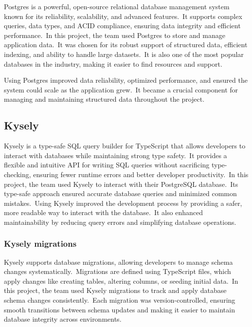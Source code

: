 Postgres is a powerful, open-source relational database management system known for its reliability, scalability, and advanced features.\ It supports complex queries, data types, and ACID compliance, ensuring data integrity and efficient performance.\ In this project, the team used Postgres to store and manage application data.\ It was chosen for its robust support of structured data, efficient indexing, and ability to handle large datasets.\ It is also one of the most popular databases in the industry, making it easier to find resources and support.\cite[Postgres]{postgres}

Using Postgres improved data reliability, optimized performance, and ensured the system could scale as the application grew.\ It became a crucial component for managing and maintaining structured data throughout the project.

\subsection{Kysely}\label{subsec:kysely}

Kysely is a type-safe SQL query builder for TypeScript that allows developers to interact with databases while maintaining strong type safety.\ It provides a flexible and intuitive API for writing SQL queries without sacrificing type-checking, ensuring fewer runtime errors and better developer productivity.\ In this project, the team used Kysely to interact with their PostgreSQL database.\ Its type-safe approach ensured accurate database queries and minimized common mistakes.\ Using Kysely improved the development process by providing a safer, more readable way to interact with the database.\ It also enhanced maintainability by reducing query errors and simplifying database operations.\cite[Kysely]{kysely}

\subsubsection{Kysely migrations}\label{subsubsec:kysely-migrations}

Kysely supports database migrations, allowing developers to manage schema changes systematically.\ Migrations are defined using TypeScript files, which apply changes like creating tables, altering columns, or seeding initial data.\ In this project, the team used Kysely migrations to track and apply database schema changes consistently.\ Each migration was version-controlled, ensuring smooth transitions between schema updates and making it easier to maintain database integrity across environments.

